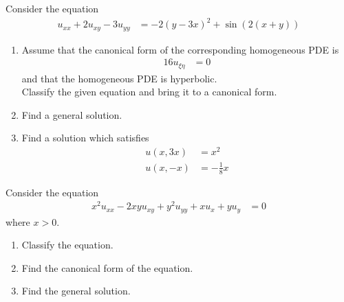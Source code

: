 \documentclass[titlepage, fleqn, a4paper, 12pt, twoside]{article}
\theoremstyle{definition}
\theoremstyle{theorem}
\begin{document}
\begin{question}
	Consider the equation
	\begin{align*}
		u_{x x} + 2 u_{x y} - 3 u_{y y} & = -2 (y - 3 x)^2 + \sin\left( 2 (x + y) \right)
	\end{align*}
	\begin{enumerate}
		\item
			Assume that the canonical form of the corresponding homogeneous PDE is
			\begin{align*}
				16 u_{\xi \eta} & = 0
			\end{align*}
			and that the homogeneous PDE is hyperbolic.\\
			Classify the given equation and bring it to a canonical form.
		\item
			Find a general solution.
		\item
			Find a solution which satisfies
			\begin{align*}
				u(x,3x) & = x^2 \\
				u(x,-x) & = -\frac{1}{8} x
			\end{align*}
	\end{enumerate}
\end{question}

\begin{question}
	Consider the equation
	\begin{align*}
		x^2 u_{x x} - 2 x y u_{x y} + y^2 u_{y y} + x u_x + y u_y & = 0
	\end{align*}
	where $x > 0$.
	\begin{enumerate}
		\item Classify the equation.
		\item Find the canonical form of the equation.
		\item Find the general solution.
	\end{enumerate}
\end{question}
\end{document}
